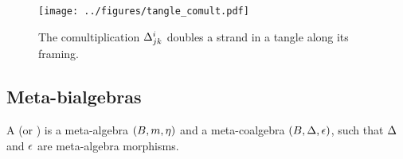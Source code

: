 \documentclass{beamer}
\begin{document}
\begin{frame}
        \begin{figure}
                \centering
                \texttt{[image: ../figures/tangle\_comult.pdf]}
                \caption{%
                        The comultiplication $\Delta^{i}_{jk}$ doubles a
                        strand in a tangle along its framing.%
                }
                \label{fig:tangle_comult}
        \end{figure}
\end{frame}

\subsection{Meta-bialgebras}

\begin{frame}
        \begin{definition}
                A  (or ) is a
                meta-algebra $(B,m,\eta)$ and a meta-coalgebra
                $(B,\Delta,\epsilon)$, such that $\Delta$ and $\epsilon$ are
                meta-algebra morphisms.
        \end{definition}
\end{frame}
\end{document}
